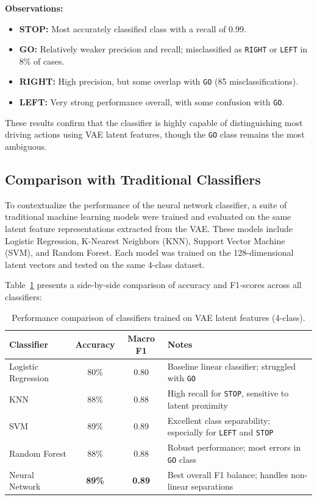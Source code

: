 \textbf{Observations:}
\begin{itemize}
    \item \textbf{STOP:} Most accurately classified class with a recall of 0.99.
    \item \textbf{GO:} Relatively weaker precision and recall; misclassified as \texttt{RIGHT} or \texttt{LEFT} in 8\% of cases.
    \item \textbf{RIGHT:} High precision, but some overlap with \texttt{GO} (85 misclassifications).
    \item \textbf{LEFT:} Very strong performance overall, with some confusion with \texttt{GO}.
\end{itemize}

These results confirm that the classifier is highly capable of distinguishing most driving actions using VAE latent features, though the \texttt{GO} class remains the most ambiguous.




\subsection{Comparison with Traditional Classifiers}

To contextualize the performance of the neural network classifier, a suite of traditional machine learning models were trained and evaluated on the same latent feature representations extracted from the VAE. These models include Logistic Regression, K-Nearest Neighbors (KNN), Support Vector Machine (SVM), and Random Forest. Each model was trained on the 128-dimensional latent vectors and tested on the same 4-class dataset.

Table~\ref{tab:classifier_comparison} presents a side-by-side comparison of accuracy and F1-scores across all classifiers:

\begin{table}[h]
\centering
\small 
\begin{tabular}{p{2.5cm}ccp{3.5cm}}
\toprule
\textbf{Classifier} & \textbf{Accuracy} & \textbf{Macro F1} & \textbf{Notes} \\
\midrule
Logistic Regression & 80\% & 0.80 & Baseline linear classifier; struggled with \texttt{GO} \\[2pt]
KNN & 88\% & 0.88 & High recall for \texttt{STOP}, sensitive to latent proximity \\[2pt]
SVM & 89\% & 0.89 & Excellent class separability; especially for \texttt{LEFT} and \texttt{STOP} \\[2pt]
Random Forest & 88\% & 0.88 & Robust performance; most errors in \texttt{GO} class \\[2pt]
Neural Network & \textbf{89\%} & \textbf{0.89} & Best overall F1 balance; handles non-linear separations \\
\bottomrule
\end{tabular}
\caption{Performance comparison of classifiers trained on VAE latent features (4-class).}
\label{tab:classifier_comparison}
\end{table}


